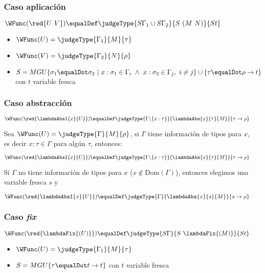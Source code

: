 \subsubsection{Caso aplicación}
$\WFunc(\red{U~V}) \equalDef \judgeType{S\Gamma_1\cup S\Gamma_2}{S~(M~N)}{St}$
\begin{centrado}
	\begin{itemize}
		\item $\WFunc(U) = \judgeType{\Gamma_1}{M}{\tau}$
		\item $\WFunc(V) = \judgeType{\Gamma_2}{N}{\rho}$
		\item $S = MGU\{\sigma_1\equalDot \sigma_2~|~x:\sigma_1\in\Gamma_i~\land~x:\sigma_2\in\Gamma_j,~i\neq j\}\cup\{\tau\equalDot\rho\to t\}$ con $t$ variable fresca
	\end{itemize}
\end{centrado}

\subsubsection{Caso abstracción}
$$\WFunc(\red{\lambdaAbsI{x}{U}}) \equalDef \judgeType{\Gamma \backslash\{x:\tau\}}{\lambdaAbs{x}{\tau}{M}}{\tau\to\rho}$$


Sea $\WFunc(U) = \judgeType{\Gamma}{M}{\rho}$, si $\Gamma$ tiene información de tipos para $x$, es decir $x:\tau\in\Gamma$ para algún $\tau$, entonces:

$$\WFunc(\red{\lambdaAbsI{x}{U}}) \equalDef \judgeType{\Gamma \backslash\{x:\tau\}}{\lambdaAbs{x}{\tau}{M}}{\tau\to\rho}$$

Si $\Gamma$ no tiene información de tipos para $x$ ($x\notin \text{Dom}(\Gamma)$), entonces elegimos una variable fresca $s$ y

$$\WFunc(\red{\lambdaAbsI{x}{U}}) \equalDef \judgeType{\Gamma}{\lambdaAbs{x}{s}{M}}{s\to\rho}$$

\subsubsection{Caso \texorpdfstring{\textit{fix}}{fix}}
$\WFunc(\red{\lambdaFix{(U)}}) \equalDef \judgeType{S\Gamma}{S~\lambdaFix{(M)}}{St}$
\begin{centrado}
	\begin{itemize}
		\item $\WFunc(U) = \judgeType{\Gamma_1}{M}{\tau}$
		\item $S = MGU\{\tau\equalDot t\to t\}$ con $t$ variable fresca
	\end{itemize}
\end{centrado}

